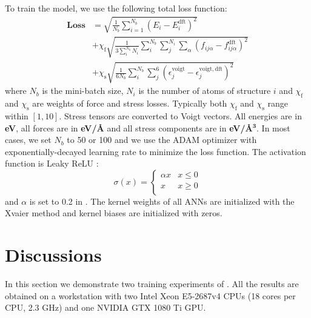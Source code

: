 \documentclass[preprint]{revtex4-2}
\begin{document}
To train the model, we use the following total loss function:
\begin{align}
\label{eq:loss}
\mathbf{Loss} & = \sqrt{\frac{1}{N_{b}}\sum_{i=1}^{N_{b}}{\left(
    E_{i} - E_{i}^{\mathrm{dft}}
\right)^2}} \nonumber \\
& + \chi_{\mathrm{f}}\sqrt{
    \frac{1}{3\sum_{i}^{N_{b}}{N_i}}\sum_{i}^{N_b}{\sum_{j}^{N_i}{
        \sum_{\alpha}{
            \left(f_{ij\alpha} - f_{ij\alpha}^{\mathrm{dft}}\right)^2
        }
    }}
} \nonumber \\
& + \chi_{\mathrm{s}}\sqrt{\frac{1}{6N_b}\sum_{i}^{N_b}{
    \sum_{j}^{6}{
        \left(
            \epsilon^{\mathrm{voigt}}_{j} - \epsilon^{\mathrm{voigt,dft}}_{j}
        \right)^2
    }
}}
\end{align}
where $N_b$ is the mini-batch size, $N_i$ is the number of atoms of structure 
$i$ and $\chi_{\mathrm{f}}$ and $\chi_{\mathrm{s}}$ are weights of force and 
stress losses. Typically both $\chi_{\mathrm{f}}$ and $\chi_{\mathrm{s}}$ range 
within $[1,10]$. Stress tensors are converted to Voigt vectors. All energies are 
in \textbf{eV}, all forces are in \textbf{eV/\AA} and all stress components are 
in \textbf{eV/\AA}$\mathbf{^3}$. In most cases, we set $N_b$ to 50 or 100 and we
use the ADAM\cite{adam} optimizer with exponentially-decayed learning rate to 
minimize the loss function. The activation function is Leaky ReLU
\cite{maas2013rectifier}:
\begin{equation}
\sigma(x) = \begin{cases}
    \alpha x & x \le 0 \\
    x & x \ge 0 \\
\end{cases}
\end{equation}
and $\alpha$ is set to 0.2 in \tensoralloy{}. The kernel weights of all ANNs are 
initialized with the Xvaier\cite{pmlr-v9-glorot10a} method and kernel biases are 
initialized with zeros.

% 
%
\section{Discussions}
\label{section:discussions}

In this section we demonstrate two training experiments of \tensoralloy{}. All 
the results are obtained on a workstation with two Intel Xeon E5-2687v4 CPUs 
(18 cores per CPU, 2.3 GHz) and one NVIDIA GTX 1080 Ti GPU.
\end{document}
